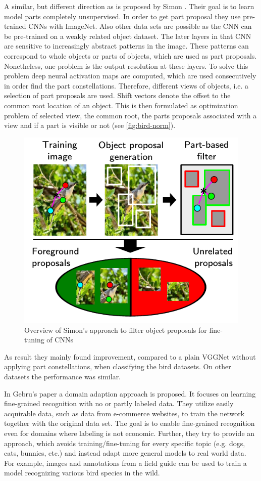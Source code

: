 \documentclass[electronic]{vgtc}             %
\begin{document}
	A similar, but different direction as \cite{Branson:2014} is proposed by Simon \cite{Simon:2015}.
	Their goal is to learn model parts completely unsupervised.
	In order to get part proposal they use pre-trained CNNs with ImageNet.
	Also other data sets are possible as the CNN can be pre-trained on a weakly related object dataset.
	The later layers in that CNN are sensitive to increasingly abstract patterns in the image.
	These patterns can correspond to whole objects or parts of objects, which are used as part proposals.
	Nonetheless, one problem is the output resolution at these layers.
	To solve this problem deep neural activation maps are computed, which are used consecutively in order find the part constellations.
	Therefore, different views of objects, i.e. a selection of part proposals are used.
	Shift vectors denote the offset to the common root location of an object.
	This is then formulated as optimization problem of selected view, the common root, the parts proposals associated with a view and if a part is visible or not (see \autoref{fig:bird-norm}).
	
		\begin{figure}[h]
			\includegraphics[width=.48\textwidth]{bird-norm}
			\caption{Overview of Simon's approach to filter object proposals for fine-tuning of CNNs\cite{Simon:2015}}
			\label{fig:bird-norm}
		\end{figure}
	
	As result they mainly found improvement, compared to a plain VGGNet without applying part constellations, when classifying the bird datasets.
	On other datasets the performance was similar.
	
	In Gebru's \cite{Gebru:2017} paper a domain adaption approach is proposed. 
	It focuses on learning fine-grained recognition with no or partly labeled data.
	They utilize easily acquirable data, such as data from e-commerce websites, to train the network together with the original data set.
	The goal is to enable fine-grained recognition even for domains where labeling is not economic.
	Further, they try to provide an approach, which avoids training/fine-tuning for every specific topic (e.g. dogs, cats, bunnies, etc.) and instead adapt more general models to real world data.
	For example, images and annotations from a field guide can be used to train a model recognizing various bird species in the wild.
	
\end{document}
